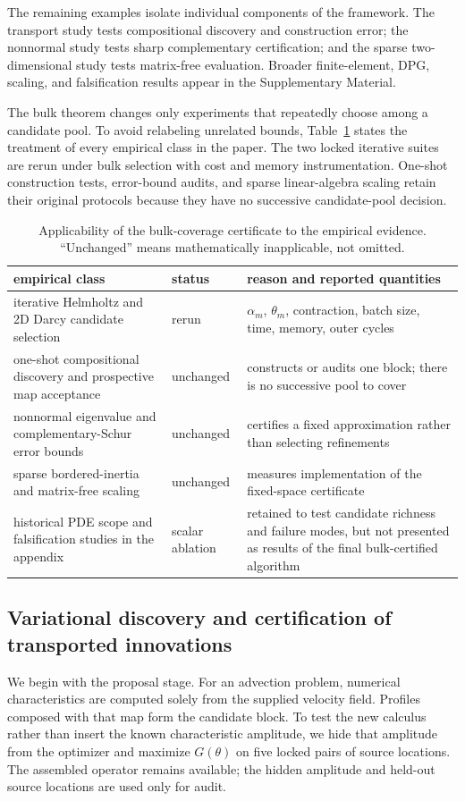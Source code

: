 \documentclass[11pt]{article}
\numberwithin{algorithm}{section}
\theoremstyle{definition}\newtheorem{definition}[theorem]{Definition}
\theoremstyle{remark}\newtheorem{remark}[theorem]{Remark}
\begin{document}
The remaining examples isolate individual components of the framework.  The
transport study tests compositional discovery and construction error; the
nonnormal study tests sharp complementary certification; and the sparse
two-dimensional study tests matrix-free evaluation.  Broader finite-element,
DPG, scaling, and falsification results appear in
the Supplementary Material.

The bulk theorem changes only experiments that repeatedly choose among a
candidate pool.  To avoid relabeling unrelated bounds, Table~\ref{tab:bulk-applicability}
states the treatment of every empirical class in the paper.  The two locked
iterative suites are rerun under bulk selection with cost and memory
instrumentation.  One-shot construction tests, error-bound audits, and sparse
linear-algebra scaling retain their original protocols because they have no
successive candidate-pool decision.
\begin{table}[H]
\centering
\caption{Applicability of the bulk-coverage certificate to the empirical
evidence.  ``Unchanged'' means mathematically inapplicable, not omitted.}
\label{tab:bulk-applicability}
\begin{tabular}{p{.29\linewidth}p{.18\linewidth}p{.43\linewidth}}
\toprule
empirical class & status & reason and reported quantities\\
\midrule
iterative Helmholtz and 2D Darcy candidate selection & rerun &
$\alpha_m$, $\theta_m$, contraction, batch size, time, memory, outer cycles\\
one-shot compositional discovery and prospective map acceptance & unchanged &
constructs or audits one block; there is no successive pool to cover\\
nonnormal eigenvalue and complementary-Schur error bounds & unchanged &
certifies a fixed approximation rather than selecting refinements\\
sparse bordered-inertia and matrix-free scaling & unchanged &
measures implementation of the fixed-space certificate\\
historical PDE scope and falsification studies in the appendix & scalar ablation &
retained to test candidate richness and failure modes, but not presented as
results of the final bulk-certified algorithm\\
\bottomrule
\end{tabular}
\end{table}

\subsection{Variational discovery and certification of transported innovations}
We begin with the proposal stage.  For an advection problem, numerical characteristics are computed solely from
the supplied velocity field.  Profiles composed with that map form the
candidate block.  To test the new calculus rather than insert the known
characteristic amplitude, we hide that amplitude from the optimizer and
maximize $G(\theta)$ on five locked pairs of source locations.  The assembled
operator remains available; the hidden amplitude and held-out source
locations are used only for audit.
\end{document}

